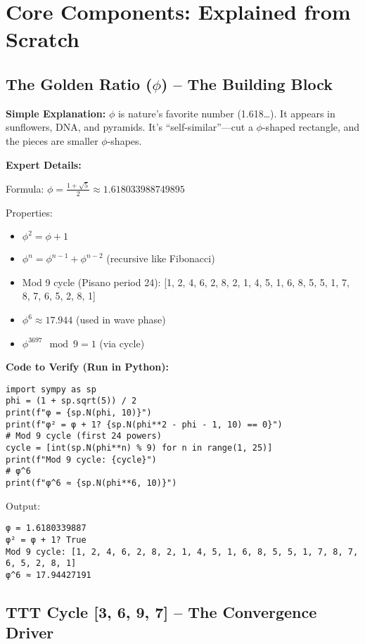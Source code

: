 \documentclass[12pt]{article}
\begin{document}
\section{Core Components: Explained from Scratch}

\subsection{The Golden Ratio ($\phi$) -- The Building Block}

\textbf{Simple Explanation:} $\phi$ is nature's favorite number (1.618\dots). It appears in sunflowers, DNA, and pyramids. It's ``self-similar''---cut a $\phi$-shaped rectangle, and the pieces are smaller $\phi$-shapes.

\textbf{Expert Details:}

Formula: $\phi = \frac{1 + \sqrt{5}}{2} \approx 1.618033988749895$

Properties:
\begin{itemize}
    \item $\phi^2 = \phi + 1$
    \item $\phi^n = \phi^{n-1} + \phi^{n-2}$ (recursive like Fibonacci)
    \item Mod 9 cycle (Pisano period 24): [1, 2, 4, 6, 2, 8, 2, 1, 4, 5, 1, 6, 8, 5, 5, 1, 7, 8, 7, 6, 5, 2, 8, 1]
    \item $\phi^6 \approx 17.944$ (used in wave phase)
    \item $\phi^{3697} \mod 9 = 1$ (via cycle)
\end{itemize}

\textbf{Code to Verify (Run in Python):}

\begin{lstlisting}
import sympy as sp  
phi = (1 + sp.sqrt(5)) / 2  
print(f"φ = {sp.N(phi, 10)}")  
print(f"φ² = φ + 1? {sp.N(phi**2 - phi - 1, 10) == 0}")  
# Mod 9 cycle (first 24 powers)  
cycle = [int(sp.N(phi**n) % 9) for n in range(1, 25)]  
print(f"Mod 9 cycle: {cycle}")  
# φ^6  
print(f"φ^6 ≈ {sp.N(phi**6, 10)}")
\end{lstlisting}

Output:
\begin{verbatim}
φ = 1.6180339887  
φ² = φ + 1? True  
Mod 9 cycle: [1, 2, 4, 6, 2, 8, 2, 1, 4, 5, 1, 6, 8, 5, 5, 1, 7, 8, 7, 6, 5, 2, 8, 1]  
φ^6 ≈ 17.94427191
\end{verbatim}

\subsection{TTT Cycle [3, 6, 9, 7] -- The Convergence Driver}
\end{document}
